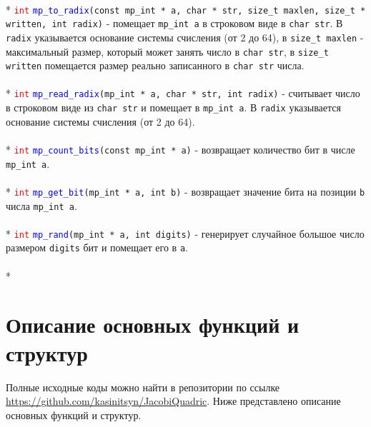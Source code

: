 \documentclass[12pt]{article}
\begin{document}
\\*
\textcolor{red}{\texttt{int}} \textcolor{blue}{\texttt{mp\_to\_radix}}\texttt{(const mp\_int * a, char * str, size\_t maxlen, size\_t * written, int radix)} - помещает \texttt{mp\_int a} в строковом виде в \texttt{char str}. В \texttt{radix} указывается основание системы счисления (от 2 до 64), в \texttt{size\_t maxlen} - максимальный размер, который может занять число в \texttt{char str}, в \texttt{size\_t written} помещается размер реально записанного в \texttt{char str} числа.\\
\\*
\textcolor{red}{\texttt{int}} \textcolor{blue}{\texttt{mp\_read\_radix}}\texttt{(mp\_int * a, char * str, int radix)} - считывает число в строковом виде из \texttt{char str} и помещает в \texttt{mp\_int a}. В \texttt{radix} указывается основание системы счисления (от 2 до 64).\\
\\*
\textcolor{red}{\texttt{int}} \textcolor{blue}{\texttt{mp\_count\_bits}}\texttt{(const mp\_int * a)} - возвращает количество бит в числе \texttt{mp\_int a}.\\
\\*
\textcolor{red}{\texttt{int}} \textcolor{blue}{\texttt{mp\_get\_bit}}\texttt{(mp\_int * a, int b)} - возвращает значение бита на позиции \texttt{b} числа \texttt{mp\_int a}.\\
\\*
\textcolor{red}{\texttt{int}} \textcolor{blue}{\texttt{mp\_rand}}\texttt{(mp\_int * a, int digits)} - генерирует случайное большое число размером \texttt{digits} бит и помещает его в \texttt{a}.\\
\\*


\section{Описание основных функций и структур}
Полные исходные коды можно найти в репозитории по ссылке \url{https://github.com/kasinitsyn/JacobiQuadric}. Ниже представлено описание основных функций и структур.
\end{document}
